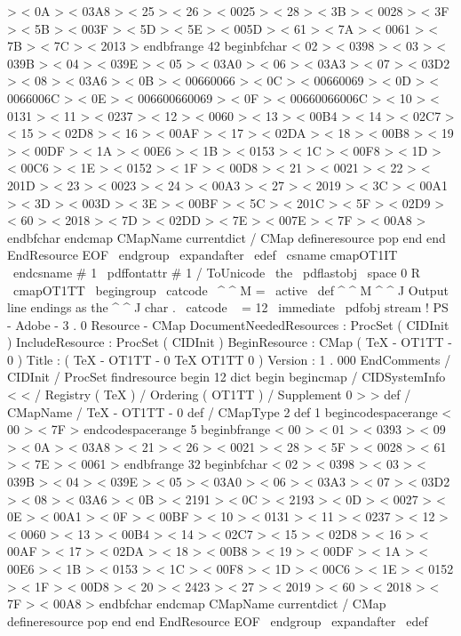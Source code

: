 {{{{>
<
0A
>
<
03A8
>
<
25
>
<
26
>
<
0025
>
<
28
>
<
3B
>
<
0028
>
<
3F
>
<
5B
>
<
003F
>
<
5D
>
<
5E
>
<
005D
>
<
61
>
<
7A
>
<
0061
>
<
7B
>
<
7C
>
<
2013
>
endbfrange
42
beginbfchar
<
02
>
<
0398
>
<
03
>
<
039B
>
<
04
>
<
039E
>
<
05
>
<
03A0
>
<
06
>
<
03A3
>
<
07
>
<
03D2
>
<
08
>
<
03A6
>
<
0B
>
<
00660066
>
<
0C
>
<
00660069
>
<
0D
>
<
0066006C
>
<
0E
>
<
006600660069
>
<
0F
>
<
00660066006C
>
<
10
>
<
0131
>
<
11
>
<
0237
>
<
12
>
<
0060
>
<
13
>
<
00B4
>
<
14
>
<
02C7
>
<
15
>
<
02D8
>
<
16
>
<
00AF
>
<
17
>
<
02DA
>
<
18
>
<
00B8
>
<
19
>
<
00DF
>
<
1A
>
<
00E6
>
<
1B
>
<
0153
>
<
1C
>
<
00F8
>
<
1D
>
<
00C6
>
<
1E
>
<
0152
>
<
1F
>
<
00D8
>
<
21
>
<
0021
>
<
22
>
<
201D
>
<
23
>
<
0023
>
<
24
>
<
00A3
>
<
27
>
<
2019
>
<
3C
>
<
00A1
>
<
3D
>
<
003D
>
<
3E
>
<
00BF
>
<
5C
>
<
201C
>
<
5F
>
<
02D9
>
<
60
>
<
2018
>
<
7D
>
<
02DD
>
<
7E
>
<
007E
>
<
7F
>
<
00A8
>
endbfchar
endcmap
CMapName
currentdict
/
CMap
defineresource
pop
end
end
%
%
EndResource
%
%
EOF
}
\
endgroup
\
expandafter
\
edef
\
csname
cmapOT1IT
\
endcsname
#
1
{
%
\
pdffontattr
#
1
{
/
ToUnicode
\
the
\
pdflastobj
\
space
0
R
}
%
}
%
%
%
\
cmapOT1TT
\
begingroup
\
catcode
\
^
^
M
=
\
active
\
def
^
^
M
{
^
^
J
}
%
Output
line
endings
as
the
^
^
J
char
.
\
catcode
\
%
=
12
\
immediate
\
pdfobj
stream
{
%
!
PS
-
Adobe
-
3
.
0
Resource
-
CMap
%
%
DocumentNeededResources
:
ProcSet
(
CIDInit
)
%
%
IncludeResource
:
ProcSet
(
CIDInit
)
%
%
BeginResource
:
CMap
(
TeX
-
OT1TT
-
0
)
%
%
Title
:
(
TeX
-
OT1TT
-
0
TeX
OT1TT
0
)
%
%
Version
:
1
.
000
%
%
EndComments
/
CIDInit
/
ProcSet
findresource
begin
12
dict
begin
begincmap
/
CIDSystemInfo
<
<
/
Registry
(
TeX
)
/
Ordering
(
OT1TT
)
/
Supplement
0
>
>
def
/
CMapName
/
TeX
-
OT1TT
-
0
def
/
CMapType
2
def
1
begincodespacerange
<
00
>
<
7F
>
endcodespacerange
5
beginbfrange
<
00
>
<
01
>
<
0393
>
<
09
>
<
0A
>
<
03A8
>
<
21
>
<
26
>
<
0021
>
<
28
>
<
5F
>
<
0028
>
<
61
>
<
7E
>
<
0061
>
endbfrange
32
beginbfchar
<
02
>
<
0398
>
<
03
>
<
039B
>
<
04
>
<
039E
>
<
05
>
<
03A0
>
<
06
>
<
03A3
>
<
07
>
<
03D2
>
<
08
>
<
03A6
>
<
0B
>
<
2191
>
<
0C
>
<
2193
>
<
0D
>
<
0027
>
<
0E
>
<
00A1
>
<
0F
>
<
00BF
>
<
10
>
<
0131
>
<
11
>
<
0237
>
<
12
>
<
0060
>
<
13
>
<
00B4
>
<
14
>
<
02C7
>
<
15
>
<
02D8
>
<
16
>
<
00AF
>
<
17
>
<
02DA
>
<
18
>
<
00B8
>
<
19
>
<
00DF
>
<
1A
>
<
00E6
>
<
1B
>
<
0153
>
<
1C
>
<
00F8
>
<
1D
>
<
00C6
>
<
1E
>
<
0152
>
<
1F
>
<
00D8
>
<
20
>
<
2423
>
<
27
>
<
2019
>
<
60
>
<
2018
>
<
7F
>
<
00A8
>
endbfchar
endcmap
CMapName
currentdict
/
CMap
defineresource
pop
end
end
%
%
EndResource
%
%
EOF
}
\
endgroup
\
expandafter
\
edef
}}}
